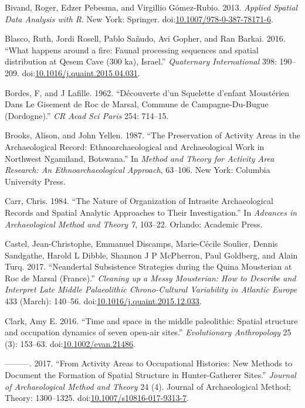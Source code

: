 \documentclass[smallextended]{svjour3}       %
\begin{document}
\hypertarget{ref-Bivand2013}{}
Bivand, Roger, Edzer Pebesma, and Virgillio Gómez-Rubio. 2013.
\emph{Applied Spatial Data Analysis with R}. New York: Springer.
doi:\href{https://doi.org/10.1007/978-0-387-78171-6}{10.1007/978-0-387-78171-6}.

\hypertarget{ref-Blasco2016}{}
Blasco, Ruth, Jordi Rosell, Pablo Sañudo, Avi Gopher, and Ran Barkai.
2016. ``What happens around a fire: Faunal processing sequences and
spatial distribution at Qesem Cave (300 ka), Israel.'' \emph{Quaternary
International} 398: 190--209.
doi:\href{https://doi.org/10.1016/j.quaint.2015.04.031}{10.1016/j.quaint.2015.04.031}.

\hypertarget{ref-bordes_decouverte_1962}{}
Bordes, F, and J Lafille. 1962. ``Découverte d'un Squelette d'enfant
Moustérien Dans Le Gisement de Roc de Marsal, Commune de
Campagne-Du-Bugue (Dordogne).'' \emph{CR Acad Sci Paris} 254: 714--15.

\hypertarget{ref-Brooks1987}{}
Brooks, Alison, and John Yellen. 1987. ``The Preservation of Activity
Areas in the Archaeological Record: Ethnoarchaeological and
Archaeological Work in Northwest Ngamiland, Botswana.'' In \emph{Method
and Theory for Activity Area Research: An Ethnoarchaeological Approach},
63--106. New York: Columbia University Press.

\hypertarget{ref-Carr1984}{}
Carr, Chris. 1984. ``The Nature of Organization of Intrasite
Archaeological Records and Spatial Analytic Approaches to Their
Investigation.'' In \emph{Advances in Archaeological Method and Theory
7}, 103--22. Orlando: Academic Press.

\hypertarget{ref-castel_neandertal_2017}{}
Castel, Jean-Christophe, Emmanuel Discamps, Marie-Cécile Soulier, Dennis
Sandgathe, Harold L Dibble, Shannon J P McPherron, Paul Goldberg, and
Alain Turq. 2017. ``Neandertal Subsistence Strategies during the Quina
Mousterian at Roc de Marsal (France).'' \emph{Cleaning up a Messy
Mousterian: How to Describe and Interpret Late Middle Palaeolithic
Chrono-Cultural Variability in Atlantic Europe} 433 (March): 140--56.
doi:\href{https://doi.org/10.1016/j.quaint.2015.12.033}{10.1016/j.quaint.2015.12.033}.

\hypertarget{ref-Clark2016}{}
Clark, Amy E. 2016. ``Time and space in the middle paleolithic: Spatial
structure and occupation dynamics of seven open-air sites.''
\emph{Evolutionary Anthropology} 25 (3): 153--63.
doi:\href{https://doi.org/10.1002/evan.21486}{10.1002/evan.21486}.

\hypertarget{ref-Clark2017}{}
---------. 2017. ``From Activity Areas to Occupational Histories: New
Methods to Document the Formation of Spatial Structure in
Hunter-Gatherer Sites.'' \emph{Journal of Archaeological Method and
Theory} 24 (4). Journal of Archaeological Method; Theory: 1300--1325.
doi:\href{https://doi.org/10.1007/s10816-017-9313-7}{10.1007/s10816-017-9313-7}.
\end{document}
